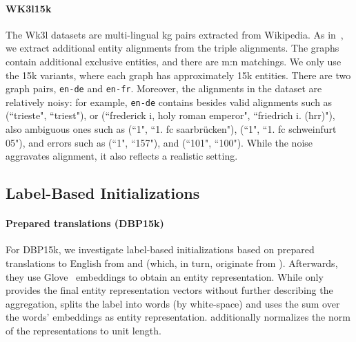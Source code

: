 \documentclass[runningheads]{llncs}
\begin{document}
\paragraph{WK3l15k}
The Wk3l datasets are multi-lingual \gls{kg} pairs extracted from Wikipedia.
As in~\cite{DBLP:conf/ecir/BerrendorfFMT020}, we extract additional entity alignments from the triple alignments.
The graphs contain additional exclusive entities, and there are m:n matchings.
We only use the 15k variants, where each graph has approximately 15k entities.
There are two graph pairs, \texttt{en-de} and \texttt{en-fr}.
Moreover, the alignments in the dataset are relatively noisy:
for example, \texttt{en-de} contains besides valid alignments such as (``trieste", ``triest"), or (``frederick i, holy roman emperor", ``friedrich i. (hrr)"), also ambiguous ones such as (``1", ``1. fc saarbrücken"), (``1", ``1. fc schweinfurt 05"), and errors such as (``1", ``157"), and (``101", ``100").
While the noise aggravates alignment, it also reflects a realistic setting.


\subsection{Label-Based Initializations}
\label{sec:init}

\paragraph{Prepared translations (DBP15k)}
For DBP15k, we investigate label-based initializations based on prepared translations to English from \cite{DBLP:conf/ijcai/WuLF0Y019} and \cite{DBLP:conf/iclr/FeyL0MK20} (which, in turn, originate from \cite{DBLP:conf/acl/XuWYFSWY19}).
Afterwards, they use Glove~\cite{DBLP:conf/emnlp/PenningtonSM14} embeddings to obtain an entity representation.
While \cite{DBLP:conf/ijcai/WuLF0Y019} only provides the final entity representation vectors without further describing the aggregation, \cite{DBLP:conf/iclr/FeyL0MK20} splits the label into words (by white-space) and uses the sum over the words' embeddings as entity representation.
\cite{DBLP:conf/ijcai/WuLF0Y019} additionally normalizes the norm of the representations to unit length.
\end{document}
